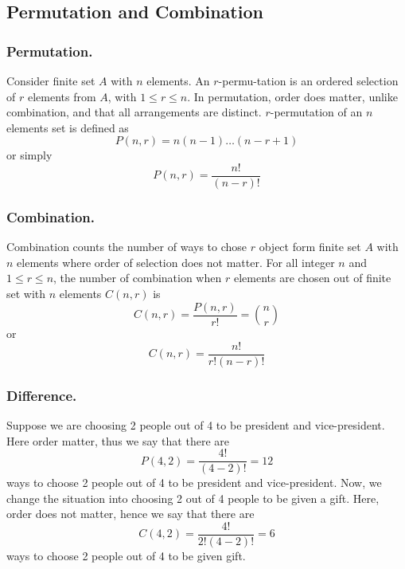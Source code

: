 \documentclass[../../main.tex]{subfiles}
\begin{document}
\subsection{Permutation and Combination}
\subsubsection{Permutation.} Consider finite set $A$ with $n$ elements. An $r$-permu-tation is an ordered selection of $r$ elements from $A$, with $1\leq r\leq n$. In permutation, order does matter, unlike combination, and that all arrangements are distinct. $r$-permutation of an $n$ elements set is defined as 
\begin{equation*}
    P(n,r)=n(n-1)\dots(n-r+1)
\end{equation*}
or simply
\begin{equation*}
    P(n,r)=\frac{n!}{(n-r)!}
\end{equation*}

\subsubsection{Combination.} Combination counts the number of ways to chose $r$ object form finite set $A$ with $n$ elements where order of selection does not matter. For all integer $n$ and $1\leq r\leq n$, the number of combination when $r$ elements are chosen out of finite set with $n$ elements $C(n,r)$ is 
\begin{equation*}
    C(n,r)=\frac{P(n,r)}{r!}={n \choose r }
\end{equation*}
or 
\begin{equation*}
    C(n,r)=\frac{n!}{r!(n-r)!}
\end{equation*}

\subsubsection{Difference.} Suppose we are choosing 2 people out of 4 to be president and vice-president. Here order matter, thus we say that there are 
\begin{equation*}
    P(4,2)=\frac{4!}{(4-2)!}=12
\end{equation*}
ways to choose 2 people out of 4 to be president and vice-president. Now, we change the situation into choosing 2 out of 4 people to be given a gift. Here, order does not matter, hence we say that there are 
\begin{equation*}
    C(4,2)=\frac{4!}{2!(4-2)!}=6
\end{equation*}
ways to choose 2 people out of 4 to be given gift.
\end{document}
